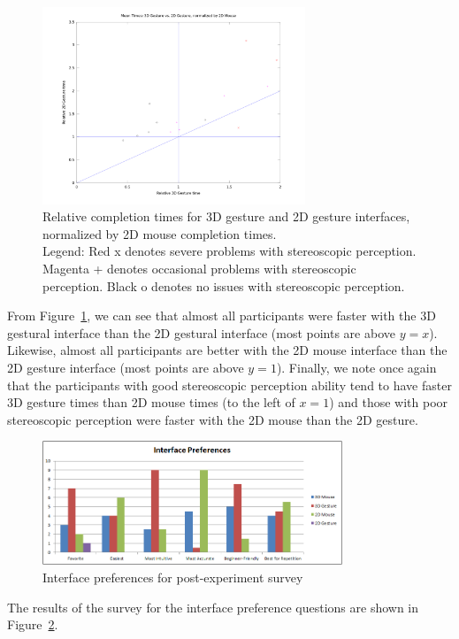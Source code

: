 \documentclass[pageno]{jpaper}
\begin{document}
\begin{figure}[h]
\centering
\includegraphics[width=0.7\textwidth]{figures/gesturebymouse2d.png}
\caption{Relative completion times for 3D gesture and 2D gesture interfaces,
normalized by 2D mouse completion times. \\
Legend: Red x denotes severe problems with stereoscopic perception. Magenta +
denotes occasional problems with stereoscopic perception. Black o denotes no
issues with stereoscopic perception.}
\label{fig:gesturevs2dm}
\end{figure}
From Figure~\ref{fig:gesturevs2dm}, we can see that almost all participants were
faster with the 3D gestural interface than the 2D gestural interface (most
points are above $y = x$). Likewise, almost all participants are better with the
2D mouse interface than the 2D gesture interface (most points are above $y=1$).
Finally, we note once again that the participants with good stereoscopic
perception ability tend to have faster 3D gesture times than 2D mouse times (to
the left of $x=1$) and those with poor stereoscopic perception were faster with
the 2D mouse than the 2D gesture.

\begin{figure}[h]
\centering
\includegraphics[width=0.8\textwidth]{figures/survey.png}
\caption{Interface preferences for post-experiment survey}
\label{fig:survey}
\end{figure}
The results of the survey for the interface preference questions are shown in
Figure~\ref{fig:survey}.
\end{document}
